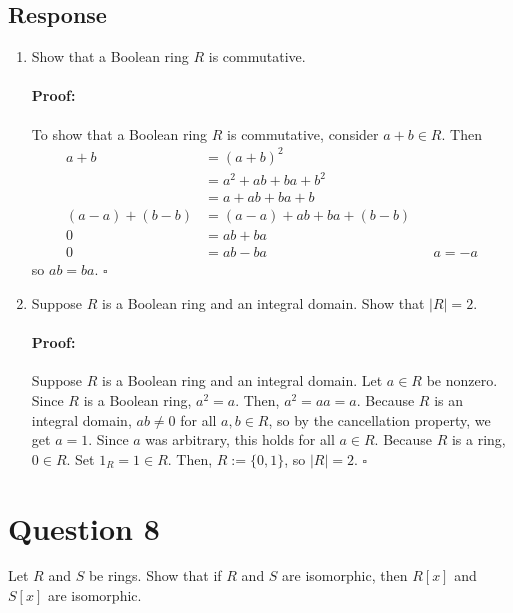\documentclass [12pt] {article}
\newenvironment{proof}{\paragraph{Proof:}}{\hfill$\square$}
\begin{document}
\subsection*{Response}
\begin{enumerate}
    \item Show that a Boolean ring $R$ is commutative. \vspace{-12pt}

        \begin{proof}
            To show that a Boolean ring $R$ is commutative, consider $a + b \in R$. Then
            \begin{align*}
                a + b &= (a + b)^2 \\
                      &= a^2 + ab + ba + b^2 \\
                      &= a + ab + ba + b \\
                (a - a) + (b - b) &= (a - a) + ab + ba + (b - b) \\
                0 &= ab + ba \\
                0 &= ab - ba && a = -a
            \end{align*}
            so $ab = ba$.
        \end{proof}

    \item Suppose $R$ is a Boolean ring and an integral domain. Show that $|R|=2$. \vspace{-12pt}

        \begin{proof}
            Suppose $R$ is a Boolean ring and an integral domain. Let $a \in R$ be nonzero. Since 
            $R$ is a Boolean ring, $a^2 = a$. Then, $a^2 = aa = a$. Because $R$ is an integral 
            domain, $ab \neq 0$ for all $a, b \in R$, so by the cancellation property, we get 
            $a = 1$. Since $a$ was arbitrary, this holds for all $a \in R$. Because $R$ is a ring, 
            $0 \in R$. Set $1_R = 1 \in R$. Then, $R := \{ 0, 1 \}$, so $|R| = 2$.
        \end{proof}
\end{enumerate} 
\newpage

\section*{Question 8}
Let $R$ and $S$ be rings. Show that if $R$ and $S$ are isomorphic, then $R[x]$ and $S[x]$ are isomorphic. 
\end{document}
